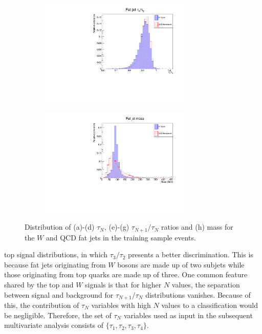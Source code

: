\documentclass[main]{subfiles} %
\begin{document}
\begin{figure}[H]
\begin{subfigure}[h]{0.49\textwidth}
          \caption{}
         \label{fig:W_distribution_tau32}
     \end{subfigure}
     \par\bigskip 
     \begin{subfigure}[h]{0.49\textwidth}
         \centering
         \includegraphics[width=0.8\textwidth]{../Figures/Results/W_distributions/W_tau43_distribution.pdf}
          \caption{}
         \label{fig:W_distribution_tau43}
     \end{subfigure}
     \begin{subfigure}[h]{0.49\textwidth}
         \centering
         \includegraphics[width=0.8\textwidth]{../Figures/Results/W_distributions/W_mass_distribution.pdf}
          \caption{}
         \label{fig:W_distribution_mass}
     \end{subfigure}
     \caption{Distribution of (a)\;-\;(d) $\tau_N$, (e)\;-\;(g) $\tau_{N+1}/\tau_N$ ratios and (h) mass for the $W$ and QCD fat jets in the training sample events.}
        \label{fig:W_distributions}
\end{figure}

top signal distributions, in which $\tau_3/\tau_2$ presents a better discrimination. This is because fat jets originating from $W$ bosons are made up of two subjets while those originating from top quarks are made up of three. One common feature shared by the top and $W$ signals is that for higher $N$ values, the separation between signal and background for $\tau_{N+1}/\tau_N$ distributions vanishes. Because of this, the contribution of $\tau_N$ variables with high $N$ values to a classification would be negligible. Therefore, the set of $\tau_N$ variables used as input in the subsequent multivariate analysis consists of $\{\tau_1,\tau_2,\tau_3,\tau_4\}$.\\
\end{document}
